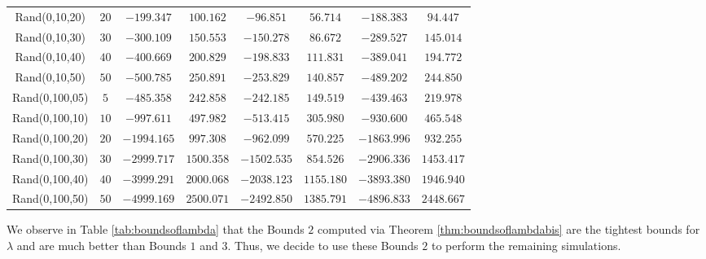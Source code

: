 \documentclass[3p]{elsarticle}
\begin{document}
\begin{table}[h!]
\begin{center}
{\begin{tabular}{c|c|cc|cc|cc}
				Rand(0,10,20) & $20$ & $-199.347$ & $100.162$ & $-96.851$ & $56.714$ & $-188.383$ & $94.447$ \\ 
				Rand(0,10,30) & $30$ & $-300.109$ & $150.553$ & $-150.278$ & $86.672$ & $-289.527$ & $145.014$ \\ 
				Rand(0,10,40) & $40$ & $-400.669$ & $200.829$ & $-198.833$ & $111.831$ & $-389.041$ & $194.772$ \\ 
				Rand(0,10,50) & $50$ & $-500.785$ & $250.891$ & $-253.829$ & $140.857$ & $-489.202$ & $244.850$ \\ 
				\hline
				Rand(0,100,05) & $5$ & $-485.358$ & $242.858$ & $-242.185$ & $149.519$ & $-439.463$ & $219.978$ \\ 
				Rand(0,100,10) & $10$ & $-997.611$ & $497.982$ & $-513.415$ & $305.980$ & $-930.600$ & $465.548$ \\ 
				Rand(0,100,20) & $20$ & $-1994.165$ & $997.308$ & $-962.099$ & $570.225$ & $-1863.996$ & $932.255$ \\ 
				Rand(0,100,30) & $30$ & $-2999.717$ & $1500.358$ & $-1502.535$ & $854.526$ & $-2906.336$ & $1453.417$ \\ 
				Rand(0,100,40) & $40$ & $-3999.291$ & $2000.068$ & $-2038.123$ & $1155.180$ & $-3893.380$ & $1946.940$ \\ 
				Rand(0,100,50) & $50$ & $-4999.169$ & $2500.071$ & $-2492.850$ & $1385.791$ & $-4896.833$ & $2448.667$ \\ 
				\hline 
			\end{tabular} 
		}
	\end{center}
\end{table}

We observe in Table \ref{tab:boundsoflambda} that the Bounds $2$ computed via Theorem \ref{thm:boundsoflambdabis} are the tightest bounds for $\lambda$ and are much better than Bounds $1$ and $3$. Thus, we decide to use these Bounds $2$ to perform the remaining simulations. 
\end{document}
